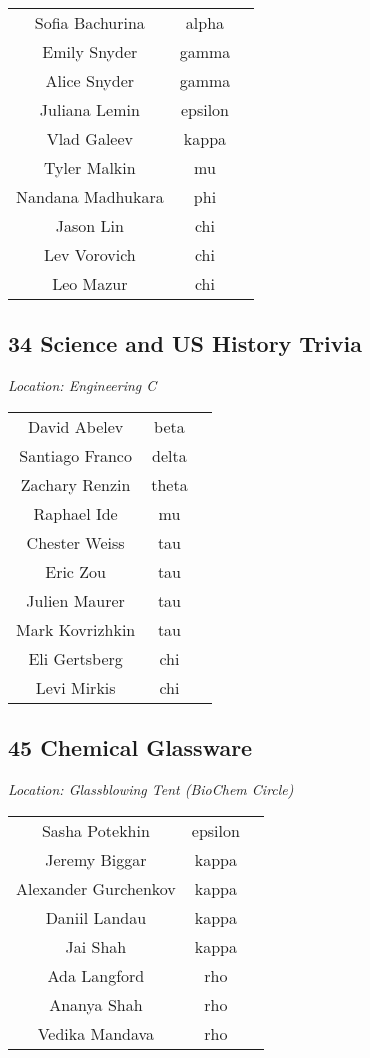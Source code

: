 \documentclass{article}
\begin{document}
\setlength{\tabcolsep}{60pt}
\centering
\begin{tabular}{c c c}
Sofia Bachurina & alpha \\
Emily Snyder & gamma \\
Alice Snyder & gamma \\
Juliana Lemin & epsilon \\
Vlad Galeev & kappa \\
Tyler Malkin & mu \\
Nandana Madhukara & phi \\
Jason Lin & chi \\
Lev Vorovich & chi \\
Leo Mazur & chi \\
\end{tabular}
\begin{center}
\section*{34 Science and US History Trivia}
\end{center}
\begin{center}
\textit{Location: Engineering C}
\end{center}
\setlength{\tabcolsep}{60pt}
\centering
\begin{tabular}{c c c}
David Abelev & beta \\
Santiago Franco & delta \\
Zachary Renzin & theta \\
Raphael Ide & mu \\
Chester Weiss & tau \\
Eric Zou & tau \\
Julien Maurer & tau \\
Mark Kovrizhkin & tau \\
Eli Gertsberg & chi \\
Levi Mirkis & chi \\
\end{tabular}
\pagebreak
\begin{center}
\section*{45 Chemical Glassware}
\end{center}
\begin{center}
\textit{Location: Glassblowing Tent (BioChem Circle)}
\end{center}
\setlength{\tabcolsep}{60pt}
\centering
\begin{tabular}{c c c}
Sasha Potekhin & epsilon \\
Jeremy Biggar & kappa \\
Alexander Gurchenkov & kappa \\
Daniil Landau & kappa \\
Jai Shah & kappa \\
Ada Langford & rho \\
Ananya Shah & rho \\
Vedika Mandava & rho \\
\end{tabular}
\end{document}
